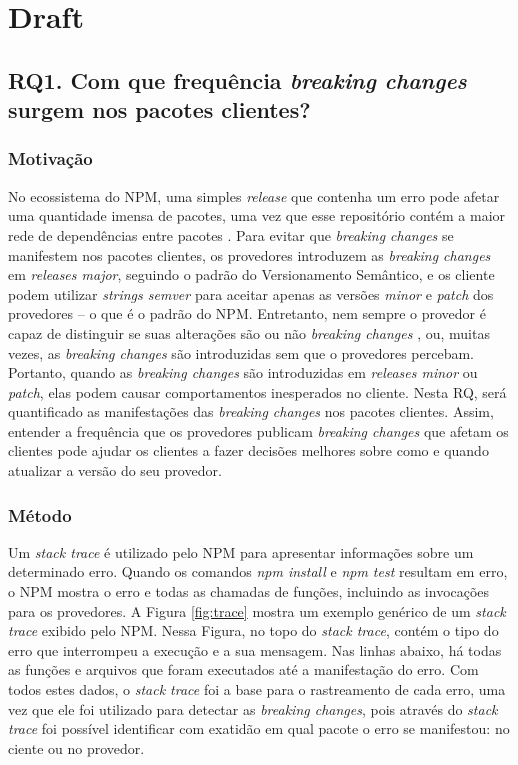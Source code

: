 \chapter{Draft}

\section{RQ1. Com que frequência \textit{breaking changes} surgem nos pacotes clientes?}
\label{sec:rq1}

\subsection{Motivação}
\label{mot:rq1}

No ecossistema do \gls{NPM}, uma simples \textit{release} que contenha um erro pode afetar uma quantidade imensa de pacotes, uma vez que esse repositório contém a maior rede de dependências entre pacotes \cite{teorical_reference:npm_2}. Para evitar que \textit{breaking changes} se manifestem nos pacotes clientes, os provedores introduzem as \textit{breaking changes} em \textit{releases major}, seguindo o padrão do Versionamento Semântico, e os cliente podem utilizar \textit{strings semver} para aceitar apenas as versões \textit{minor} e \textit{patch} dos provedores -- o que é o padrão do \gls{NPM}. Entretanto, nem sempre o provedor é capaz de distinguir se suas alterações são ou não \textit{breaking changes} \cite{noregrets2018}, ou, muitas vezes, as \textit{breaking changes} são introduzidas sem que o provedores percebam. Portanto, quando as \textit{breaking changes} são introduzidas em \textit{releases minor} ou \textit{patch}, elas podem causar comportamentos inesperados no cliente. Nesta RQ, será quantificado as manifestações das \textit{breaking changes} nos pacotes clientes. Assim, entender a frequência que os provedores publicam \textit{breaking changes} que afetam os clientes pode ajudar os clientes a fazer decisões melhores sobre como e quando atualizar a versão do seu provedor.

\subsection{Método}
\label{apr:rq1}

Um \textit{stack trace} é utilizado pelo \gls{NPM} para apresentar informações sobre um determinado erro. Quando os comandos \textit{npm install} e \textit{npm test} resultam em erro, o \Gls{NPM} mostra o erro e todas as chamadas de funções, incluindo as invocações para os provedores. A Figura \ref{fig:trace} mostra um exemplo genérico de um \textit{stack trace} exibido pelo \Gls{NPM}. Nessa Figura, no topo do \textit{stack trace}, contém o tipo do erro que interrompeu a execução e a sua mensagem. Nas linhas abaixo, há todas as funções e arquivos que foram executados até a manifestação do erro. Com todos estes dados, o \textit{stack trace} foi a base para o rastreamento de cada erro, uma vez que ele foi utilizado para detectar as \textit{breaking changes}, pois através do \textit{stack trace} foi possível identificar com exatidão em qual pacote o erro se manifestou: no ciente ou no provedor.

